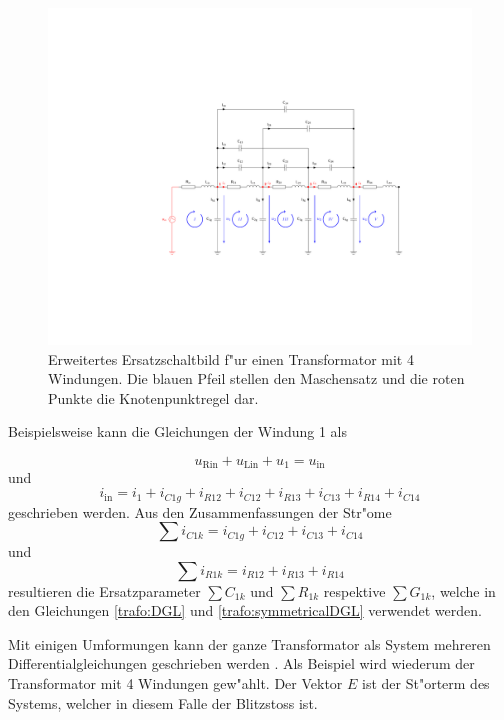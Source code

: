 \begin{refsection}
\begin{figure}
	\centering
	\includegraphics[width=\hsize]{./trafo/images/orig_trafo.pdf}
	\caption[Erweitertes Ersatzschaltbild f"ur einen Transformator mit Maschensatz und Knotenpunkt]{Erweitertes Ersatzschaltbild f"ur einen Transformator mit 4 Windungen. Die blauen Pfeil stellen den Maschensatz und die roten Punkte die Knotenpunktregel dar.}
	\label{trafo:orig}
\end{figure}

Beispielsweise kann die Gleichungen der Windung 1 als 

\begin{equation}
	u_\mathrm{Rin} + u_\mathrm{Lin} + u_1 = u_\mathrm{in}
\end{equation}
und 
\begin{equation}
	i_\mathrm{in} = i_1 + i_{C1g} + i_{R12} + i_{C12} + i_{R13} + i_{C13} + i_{R14} + i_{C14}
\end{equation}
geschrieben werden. Aus den Zusammenfassungen der Str"ome
\begin{equation*}
	\sum i_{C1k} = i_{C1g}+ i_{C12} + i_{C13} + i_{C14}
\end{equation*}
und
\begin{equation*}
	\sum i_{R1k} = i_{R12} + i_{R13} + i_{R14}
\end{equation*}
resultieren die Ersatzparameter $\sum C_{1k}$ und $\sum R_{1k}$ respektive $\sum G_{1k}$, welche in den Gleichungen \ref{trafo:DGL} und \ref{trafo:symmetricalDGL} verwendet werden.

Mit einigen Umformungen kann der ganze Transformator als System mehreren Differentialgleichungen geschrieben werden \cite{trafo:SeminarCHR}. Als Beispiel wird wiederum der Transformator mit 4 Windungen gew"ahlt. Der Vektor $E$ ist der St"orterm des Systems, welcher in diesem Falle der Blitzstoss ist.


\end{refsection}
